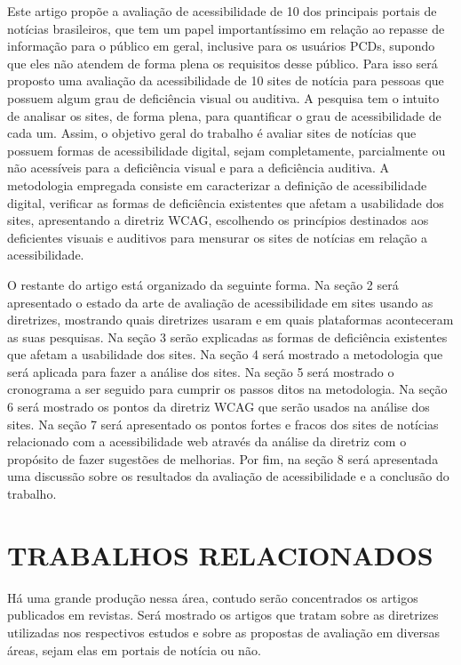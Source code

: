 \documentclass[a4paper]{article}
\begin{document}
\begin{titlepage}
Este artigo propõe a avaliação de acessibilidade de 10 dos principais portais de notícias brasileiros, que tem um papel importantíssimo em relação ao repasse de informação para o público em geral, inclusive para os usuários PCDs, supondo que eles não atendem de forma plena os requisitos desse público. Para isso será proposto uma avaliação da acessibilidade de 10 sites de notícia para pessoas que possuem algum grau de deficiência visual ou auditiva. A pesquisa tem o intuito de analisar os sites, de forma plena, para quantificar o grau de acessibilidade de cada um. Assim, o objetivo geral do trabalho é avaliar sites de notícias que possuem formas de acessibilidade digital, sejam completamente, parcialmente ou não acessíveis para a deficiência visual e para a deficiência auditiva. A metodologia empregada consiste em caracterizar a definição de acessibilidade digital, verificar as formas de deficiência existentes que afetam a usabilidade dos sites, apresentando a diretriz WCAG, escolhendo os princípios destinados aos deficientes visuais e auditivos para mensurar os sites de notícias em relação a acessibilidade.

O restante do artigo está organizado da seguinte forma.
Na seção 2 será apresentado o estado da arte de avaliação de acessibilidade em sites usando as diretrizes, mostrando quais diretrizes usaram e em quais plataformas aconteceram as suas pesquisas.
Na seção 3 serão explicadas as formas de deficiência existentes que afetam a usabilidade dos sites.
Na seção 4 será mostrado a metodologia que será aplicada para fazer a análise dos sites.
Na seção 5 será mostrado o cronograma a ser seguido para cumprir os passos ditos na metodologia.
Na seção 6 será mostrado os pontos da diretriz WCAG que serão usados na análise dos sites.
Na seção 7 será apresentado os pontos fortes e fracos dos sites de notícias relacionado com a acessibilidade web através da análise da diretriz com o propósito de fazer sugestões de melhorias.
Por fim, na seção 8 será apresentada uma discussão sobre os resultados da avaliação de acessibilidade e a conclusão do trabalho.

\section{TRABALHOS RELACIONADOS}
Há uma grande produção nessa área, contudo serão concentrados os artigos publicados em revistas. Será mostrado os artigos que tratam sobre as diretrizes utilizadas nos respectivos estudos e sobre as propostas de avaliação em diversas áreas, sejam elas em portais de notícia ou não.


\end{titlepage}
\end{document}
